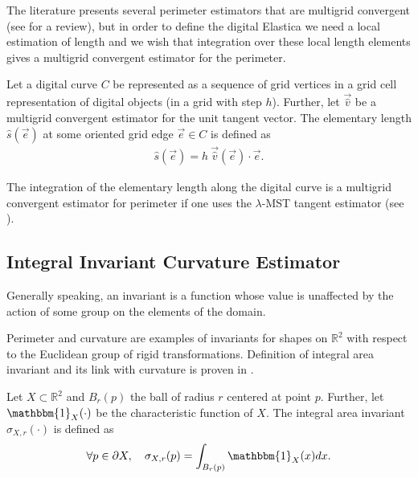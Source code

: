 \documentclass[smallextended]{svjour3}       %
\begin{document}
The literature presents several perimeter estimators that are multigrid convergent (see
\cite{coeurjolly04comparative,coeurjolly12multigrid} for a review), but in order to define the digital Elastica we need a local estimation
of length and we wish that integration over these local length elements gives a multigrid convergent estimator for the
perimeter.

\begin{definition}
  Let a digital curve $C$ be represented as a sequence of grid vertices in a grid cell representation of digital objects (in a grid with step $h$). Further, let $\vec{ \hat{v} }$ be a multigrid convergent estimator for the unit tangent vector. The elementary length $\hat{s}(\vec{e})$ at some oriented grid edge $ \vec{e} \in C$ is defined as
  \begin{align*}
    \hat{s}(\vec{e}) = h ~\vec{\hat{v}}(\vec{e}) \cdot \vec{e}.
  \end{align*}
\end{definition}
The integration of the elementary length along the digital curve is a multigrid convergent estimator for perimeter if
one uses the $\lambda$-MST \cite{lachaud07tangent} tangent estimator (see \cite{lachaud06hdr}).

\subsection{Integral Invariant Curvature Estimator}
Generally speaking, an invariant is a function whose value is unaffected by the action
of some group on the elements of the domain.

Perimeter and curvature are examples of invariants for shapes on
$\mathbb{R}^2$ with respect to the Euclidean group of rigid
transformations. Definition of integral area invariant and its link
with curvature is proven in \cite{manay04intinvariant}.


\begin{definition}
  Let $X \subset \mathbb{R}^2$ and $B_r(p)$ the ball of radius $r$ centered at point $p$. Further, let
  $\mathbbm{1}_X(\cdot)$ be the characteristic function of $X$. The integral area invariant $\sigma_{X,r}(\cdot)$ is
  defined as
  \begin{align*}
    \forall p \in \partial X, \quad \sigma_{X,r}(p) = \int_{B_r(p)}{ \mathbbm{1}_X(x) dx}.
  \end{align*}
\end{definition}
\end{document}
